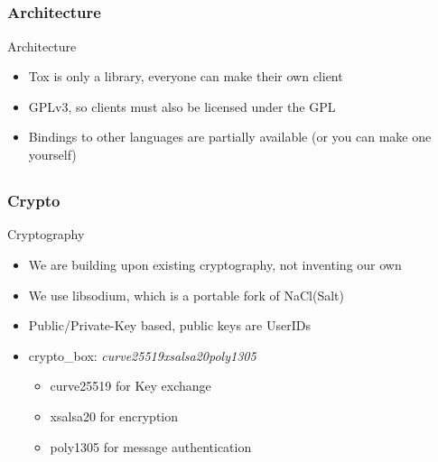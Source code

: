\documentclass{mybeamer}
\begin{document}
    \subsection{}
    \begin{frame}
        \frametitle{Architecture}
        \begin{block}{Architecture}
            \begin{itemize}
                \item Tox is only a library, everyone can make their own client
                \item GPLv3, so clients must also be licensed under the GPL
                \item Bindings to other languages are partially available (or you can make one yourself)
            \end{itemize}
        \end{block}
    \end{frame}
    \subsection{}
    \begin{frame}
        \frametitle{Crypto}
        \begin{block}{Cryptography}
            \begin{itemize}
                \item We are building upon existing cryptography, not inventing our own
                \item We use libsodium, which is a portable fork of NaCl(Salt)
                \item Public/Private-Key based, public keys are UserIDs
                \item crypto\_box: \textit{curve25519xsalsa20poly1305}
                \begin{itemize}
                	\item curve25519 for Key exchange
                    \item xsalsa20 for encryption
                    \item poly1305 for message authentication
                \end{itemize}

            \end{itemize}
        \end{block}
    \end{frame}
\end{document}
